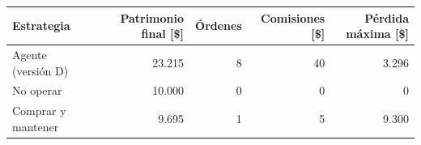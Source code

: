 \begin{tabular}{lrrrr}
\toprule
Estrategia & Patrimonio final [\$] & Órdenes & Comisiones [\$] & Pérdida máxima [\$] \\
\midrule
Agente (versión D) & 23.215 & 8 & 40 & 3.296 \\
No operar & 10.000 & 0 & 0 & 0 \\
Comprar y mantener & 9.695 & 1 & 5 & 9.300 \\
\bottomrule
\end{tabular}
